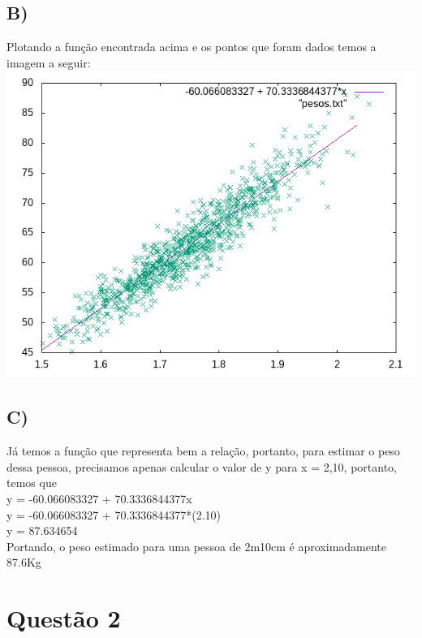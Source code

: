 \documentclass{article}
\begin{document}
    \subsection*{B)}Plotando a função encontrada acima e os pontos que foram dados temos a imagem a seguir:\\
    \includegraphics[scale = 0.85]{relacao.png}\\
    
    \subsection*{C)}
    \hspace{0.5cm}Já temos a função que representa bem a relação, portanto, para estimar o peso dessa pessoa, precisamos apenas calcular o valor de y para x = 2,10, portanto, temos que\\
    y = -60.066083327 + 70.3336844377x\\
    y = -60.066083327 + 70.3336844377*(2.10)\\
    y = 87.634654\\
    
    Portando, o peso estimado para uma pessoa de 2m10cm é aproximadamente 87.6Kg
    
\section*{Questão 2}
\end{document}

